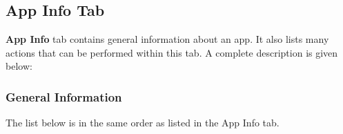 \subsection{App Info Tab}\label{subsec:app-info-tab} %
\textbf{App Info} tab contains general information about an app. It also lists many actions that can be performed within
this tab. A complete description is given below:

\subsubsection{General Information}\label{subsubsec:app-info-general-information} %
The list below is in the same order as listed in the App Info tab.
